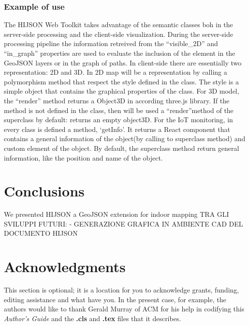 \documentclass{sig-alternate}
\begin{document}
\subsubsection{Example of use}\label{example-of-use}

The HIJSON Web Toolkit takes advantage of the semantic classes boh in the server-side processing and the client-side visualization. During the server-side processing pipeline the information retreived from the ``visible\_2D'' and ``in\_graph'' properties are used to evaluate the inclusion of the element in the GeoJSON layers or in the graph of paths. In client-side there are essentially two representation: 2D and 3D. In 2D map will be a representation by calling a polymorphism method that respect the style defined in the class. The style is a simple object that contains the graphical properties of the class. For 3D model, the ``render'' method returns a Object3D in according three.js library. If the method is not defined in the class, then will be used a ``render''method of the superclass by default: returns an empty object3D. For the IoT monitoring, in every class is defined a method, `getInfo'. It returns a React component that contains a general information of the object(by calling to superclass method) and custom element of the object. By default, the superclass method return general information, like the position and name of the object.

\section{Conclusions}\label{conclusions}

We presented HIJSON a GeoJSON extension for indoor mapping
TRA GLI SVILUPPI FUTURI:
- GENERAZIONE GRAFICA IN AMBIENTE CAD DEL DOCUMENTO HIJSON

\section{Acknowledgments}
This section is optional; it is a location for you
to acknowledge grants, funding, editing assistance and
what have you.  In the present case, for example, the
authors would like to thank Gerald Murray of ACM for
his help in codifying this \emph{Author's Guide}
and the \textbf{.cls} and \textbf{.tex} files that it describes.

%

%
%
\appendix
\end{document}
